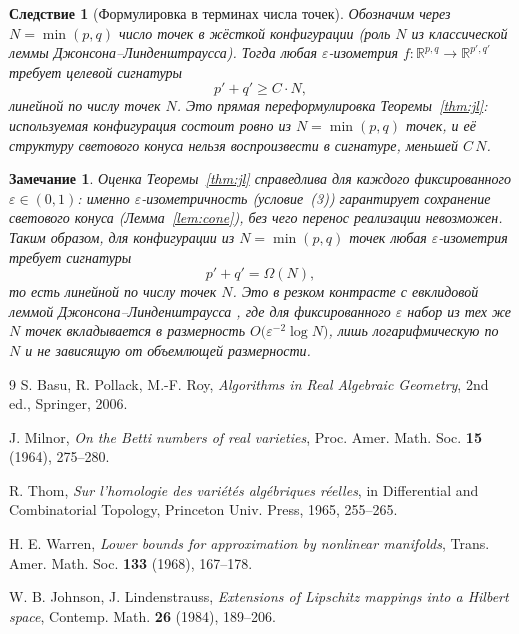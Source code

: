\documentclass[12pt]{article}
\newtheorem{corollary}{Следствие}
\newtheorem{remark}{Замечание}
\newcommand{\R}{\mathbb{R}}
\begin{document}
\begin{corollary}[Формулировка в терминах числа точек]\label{cor:points}
Обозначим через \(N=\min(p,q)\) число точек в жёсткой конфигурации (роль \(N\) из классической леммы Джонсона--Линденштраусса). Тогда любая \(\varepsilon\)-изометрия \(f:\R^{p,q}\to\R^{p',q'}\) требует целевой сигнатуры
\[
p'+q' \ge C\cdot N,
\]
\emph{линейной по числу точек} \(N\). Это прямая переформулировка Теоремы~\ref{thm:jl}: используемая конфигурация состоит ровно из \(N=\min(p,q)\) точек, и её структуру светового конуса нельзя воспроизвести в сигнатуре, меньшей \(C\,N\).
\end{corollary}

\begin{remark}
Оценка Теоремы~\ref{thm:jl} справедлива для \emph{каждого} фиксированного \(\varepsilon\in(0,1)\): именно \(\varepsilon\)-изометричность (условие~(3)) гарантирует сохранение светового конуса (Лемма~\ref{lem:cone}), без чего перенос реализации невозможен. Таким образом, для конфигурации из \(N=\min(p,q)\) точек любая \(\varepsilon\)-изометрия требует сигнатуры
\[
p'+q' = \Omega(N),
\]
то есть \emph{линейной по числу точек} \(N\). Это в резком контрасте с евклидовой леммой Джонсона--Линденштраусса \cite{JL1984}, где для фиксированного \(\varepsilon\) набор из тех же \(N\) точек вкладывается в размерность \(O\!\bigl(\varepsilon^{-2}\log N\bigr)\), лишь \emph{логарифмическую} по \(N\) и не зависящую от объемлющей размерности.
\end{remark}

\begin{thebibliography}{9}
S. Basu, R. Pollack, M.-F. Roy, \emph{Algorithms in Real Algebraic Geometry}, 2nd ed., Springer, 2006.

J. Milnor, \emph{On the Betti numbers of real varieties}, Proc. Amer. Math. Soc. \textbf{15} (1964), 275--280.

R. Thom, \emph{Sur l'homologie des vari\'et\'es alg\'ebriques r\'eelles}, in Differential and Combinatorial Topology, Princeton Univ. Press, 1965, 255--265.

H. E. Warren, \emph{Lower bounds for approximation by nonlinear manifolds}, Trans. Amer. Math. Soc. \textbf{133} (1968), 167--178.

W. B. Johnson, J. Lindenstrauss, \emph{Extensions of Lipschitz mappings into a Hilbert space}, Contemp. Math. \textbf{26} (1984), 189--206.
\end{thebibliography}
\end{document}
